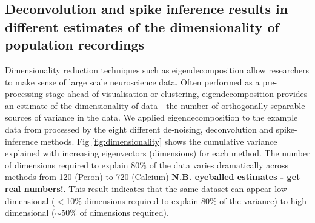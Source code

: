 \documentclass[a4paper,10pt,twocolumn]{article}
\begin{document}
\subsection{Deconvolution and spike inference results in different estimates of the dimensionality of population recordings}


Dimensionality reduction techniques such as eigendecomposition allow researchers to make sense of large scale neuroscience data. Often performed as a pre-processing stage ahead of visualisation or clustering, eigendecomposition provides an estimate of the dimensionality of data - the number of orthogonally separable sources of variance in the data. We applied eigendecomposition to the example data from \citealt{Peron2015-kd} processed by the eight different de-noising, deconvolution and spike-inference methods. Fig \ref{fig:dimensionality} shows the cumulative variance explained with increasing eigenvectors (dimensions) for each method. The number of dimensions required to explain 80$\%$ of the data varies dramatically across methods from 120 (Peron) to 720 (Calcium) \textbf{N.B. eyeballed estimates - get real numbers!}. This result indicates that the same dataset can appear low dimensional ($<$10$\%$ dimensions required to explain 80$\%$ of the variance) to high-dimensional ($\sim$50$\%$ of dimensions required).
\end{document}
